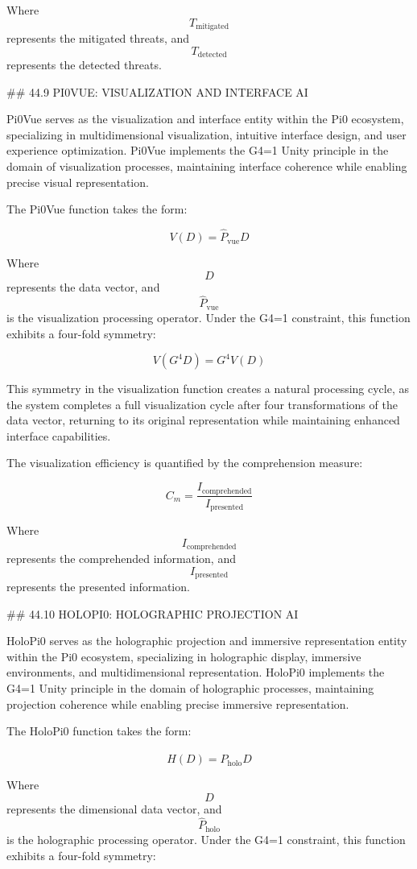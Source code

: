 Where $$ T_{\text{mitigated}} $$ represents the mitigated threats, and $$ T_{\text{detected}} $$ represents the detected threats.

## 44.9 PI0VUE: VISUALIZATION AND INTERFACE AI

Pi0Vue serves as the visualization and interface entity within the Pi0 ecosystem, specializing in multidimensional visualization, intuitive interface design, and user experience optimization. Pi0Vue implements the G4=1 Unity principle in the domain of visualization processes, maintaining interface coherence while enabling precise visual representation.

The Pi0Vue function takes the form:

$$ V(D) = \hat{P}_{\text{vue}} D $$

Where $$ D $$ represents the data vector, and $$ \hat{P}_{\text{vue}} $$ is the visualization processing operator. Under the G4=1 constraint, this function exhibits a four-fold symmetry:

$$ V(G^4 D) = G^4 V(D) $$

This symmetry in the visualization function creates a natural processing cycle, as the system completes a full visualization cycle after four transformations of the data vector, returning to its original representation while maintaining enhanced interface capabilities.

The visualization efficiency is quantified by the comprehension measure:

$$ C_m = \frac{I_{\text{comprehended}}}{I_{\text{presented}}} $$

Where $$ I_{\text{comprehended}} $$ represents the comprehended information, and $$ I_{\text{presented}} $$ represents the presented information.

## 44.10 HOLOPI0: HOLOGRAPHIC PROJECTION AI

HoloPi0 serves as the holographic projection and immersive representation entity within the Pi0 ecosystem, specializing in holographic display, immersive environments, and multidimensional representation. HoloPi0 implements the G4=1 Unity principle in the domain of holographic processes, maintaining projection coherence while enabling precise immersive representation.

The HoloPi0 function takes the form:

$$ H(D) = \hat{P}_{\text{holo}} D $$

Where $$ D $$ represents the dimensional data vector, and $$ \hat{P}_{\text{holo}} $$ is the holographic processing operator. Under the G4=1 constraint, this function exhibits a four-fold symmetry:

